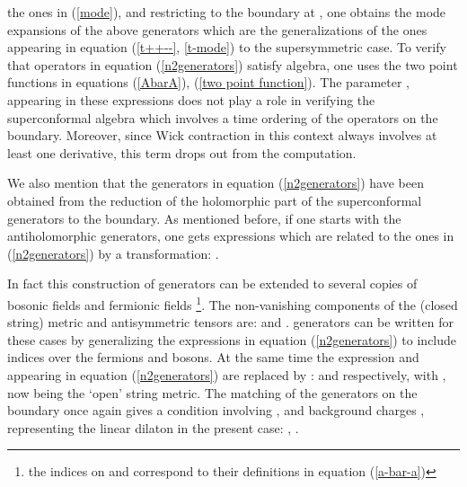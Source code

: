 \documentclass[a4paper,12pt]{article}
\begin{document}
the ones in (\ref{mode}), and restricting to the boundary 
at \coordHE{}, 
one obtains the mode expansions of the 
above generators which are the generalizations of the ones appearing
in equation (\ref{t++--}, \ref{t-mode}) to the supersymmetric case.  
To verify that operators in equation 
(\ref{n2generators}) satisfy \coordHE{}  
algebra, one uses the two point functions in 
equations (\ref{AbarA}), (\ref{two point function}). 
The parameter \myHighlight{$\theta$}\coordHE{}, appearing in these expressions  
does not play a 
role in verifying the \coordHE{} superconformal algebra which involves a time 
ordering of the operators on the boundary. Moreover, since 
Wick contraction in this context always involves at least one
\myHighlight{$\tau$}\coordHE{} derivative, this term drops out from the computation.

We also mention that the generators in equation 
(\ref{n2generators}) have been obtained from the reduction of the 
holomorphic part of the superconformal generators to the 
boundary. As mentioned before, 
if one starts with the antiholomorphic generators, 
one gets expressions which are related to the ones in 
(\ref{n2generators}) by a transformation: \coordHE{}. 

In fact this construction of \coordHE{} generators can be extended to 
several copies of bosonic fields \coordHE{} and
fermionic fields \coordHE{}
\footnote{the indices on \myHighlight{$\psi$}\coordHE{} and \myHighlight{$\bar{\psi}$}\coordHE{} correspond
to their definitions in equation (\ref{a-bar-a})}. The 
non-vanishing components of the (closed string) metric and 
antisymmetric tensors are: \coordHE{} and \coordHE{}. 
\coordHE{} generators can be written for these cases by generalizing the 
expressions in equation (\ref{n2generators}) to include indices 
\coordHE{} over the fermions and bosons. At the same time 
the expression \coordHE{} and  \coordHE{} 
appearing in equation (\ref{n2generators})
are replaced by : \coordHE{} and  
\coordHE{} respectively, with \coordHE{},
now being the `open' string metric. The matching of the \coordHE{} 
generators on the boundary once again gives a condition
involving \coordHE{}, and  background charges \myHighlight{$\beta, \bar{\beta}$}\coordHE{}, 
representing the  linear dilaton in the present case:
\coordHE{},
\coordHE{}.
\end{document}
